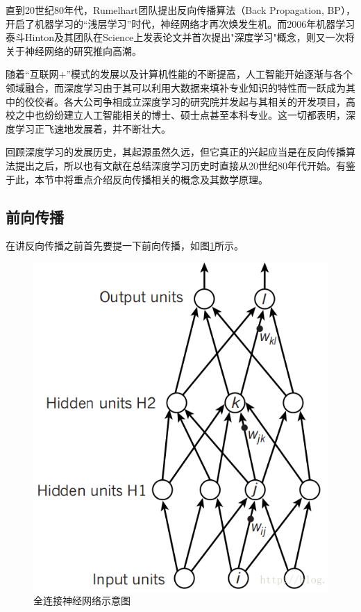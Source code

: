 \documentclass[UTF8]{ctexart}
\begin{document}
    		\indent 直到20世纪80年代，Rumelhart团队提出反向传播算法（Back Propagation, BP）\cite{Rumelhart1986Learning}，开启了机器学习的“浅层学习”时代\cite{yukai}，神经网络才再次焕发生机。而2006年机器学习泰斗Hinton及其团队在Science上发表论文并首次提出"深度学习"概念\cite{Hinton2006Reducing}，则又一次将关于神经网络的研究推向高潮。
    		
    		\indent 随着“互联网+”模式的发展以及计算机性能的不断提高，人工智能开始逐渐与各个领域融合，而深度学习由于其可以利用大数据来填补专业知识的特性而一跃成为其中的佼佼者。各大公司争相成立深度学习的研究院并发起与其相关的开发项目，高校之中也纷纷建立人工智能相关的博士、硕士点甚至本科专业。这一切都表明，深度学习正飞速地发展着，并不断壮大。
    		
    		\indent 回顾深度学习的发展历史，其起源虽然久远，但它真正的兴起应当是在反向传播算法提出之后，所以也有文献在总结深度学习历史时直接从20世纪80年代开始\cite{yukai}。有鉴于此，本节中将重点介绍反向传播相关的概念及其数学原理。
    
    	\subsection{前向传播}\label{forward}
    		
    		\indent 在讲反向传播之前首先要提一下前向传播，如图\ref{neuralNetWork}所示。
    		
    		\begin{figure}[H]
                \centering
    			\includegraphics[scale=0.25]{20171216112534046.png}
    			\caption{全连接神经网络示意图\protect\footnotemark[1]}
    			\label{neuralNetWork}
    		\end{figure}
            
\end{document}
